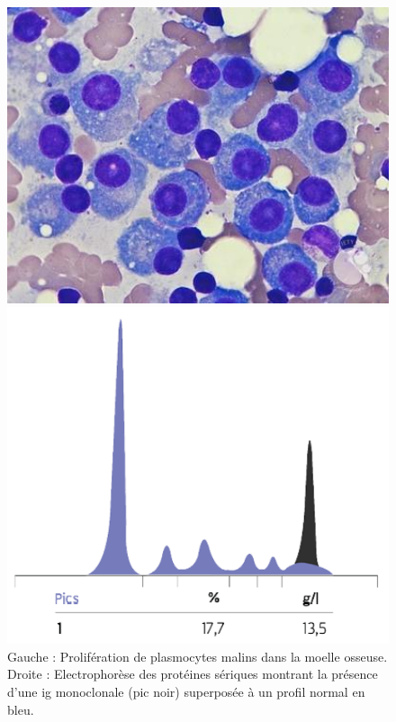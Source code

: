 \begin{figure}[H]
    \begin{minipage}{0.45\textwidth}
        \centering
        \includegraphics[width=1\textwidth]{images/mm_cells.jpeg}
    \end{minipage}
    \hfill
    \begin{minipage}{0.45\textwidth}
        \centering
        \includegraphics[width=01\textwidth]{images/pic.png}
    \end{minipage}
    \caption{Gauche : Prolifération de plasmocytes malins dans la moelle osseuse. 
    Droite : Electrophorèse des protéines sériques montrant la présence d'une \gls{ig} monoclonale (pic noir) 
    superposée à un profil normal en bleu.}
    \label{fig:mm-cells-ig}
\end{figure}

